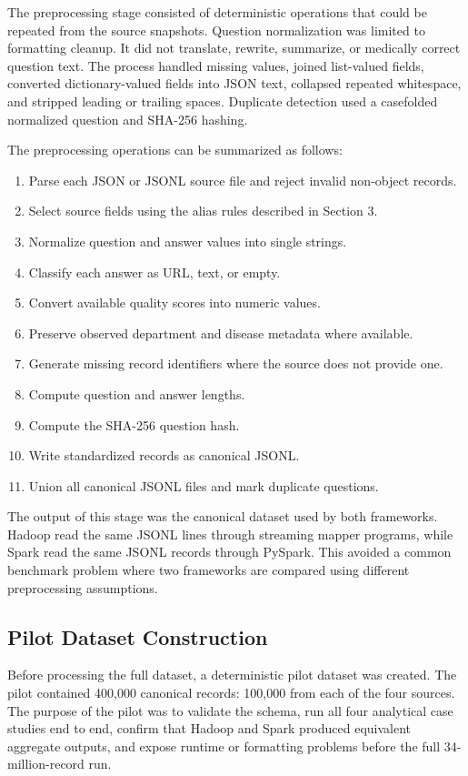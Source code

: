 \documentclass[12pt,a4paper]{article}
\begin{document}
The preprocessing stage consisted of deterministic operations that could be repeated from the source snapshots. Question normalization was limited to formatting cleanup. It did not translate, rewrite, summarize, or medically correct question text. The process handled missing values, joined list-valued fields, converted dictionary-valued fields into JSON text, collapsed repeated whitespace, and stripped leading or trailing spaces. Duplicate detection used a casefolded normalized question and SHA-256 hashing.

The preprocessing operations can be summarized as follows:

\begin{enumerate}
\item Parse each JSON or JSONL source file and reject invalid non-object records.
\item Select source fields using the alias rules described in Section 3.
\item Normalize question and answer values into single strings.
\item Classify each answer as URL, text, or empty.
\item Convert available quality scores into numeric values.
\item Preserve observed department and disease metadata where available.
\item Generate missing record identifiers where the source does not provide one.
\item Compute question and answer lengths.
\item Compute the SHA-256 question hash.
\item Write standardized records as canonical JSONL.
\item Union all canonical JSONL files and mark duplicate questions.
\end{enumerate}

The output of this stage was the canonical dataset used by both frameworks. Hadoop read the same JSONL lines through streaming mapper programs, while Spark read the same JSONL records through PySpark. This avoided a common benchmark problem where two frameworks are compared using different preprocessing assumptions.

\subsection{Pilot Dataset Construction}

Before processing the full dataset, a deterministic pilot dataset was created. The pilot contained 400,000 canonical records: 100,000 from each of the four sources. The purpose of the pilot was to validate the schema, run all four analytical case studies end to end, confirm that Hadoop and Spark produced equivalent aggregate outputs, and expose runtime or formatting problems before the full 34-million-record run.
\end{document}
